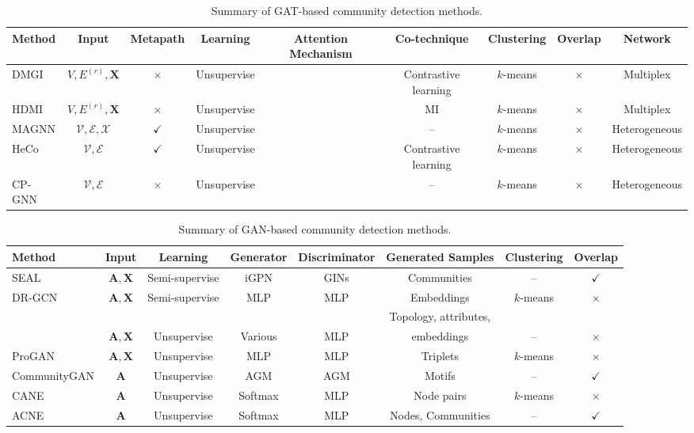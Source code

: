 \begin{table}[h]
\centering \footnotesize
\renewcommand\arraystretch{1.1}
\setlength{\tabcolsep}{2.1mm}
\caption{Summary of GAT-based community detection methods.}
\begin{tabular}{lcccccccc}
\toprule[1 pt]
\textbf{Method} & \textbf{Input} & \textbf{Metapath} & \textbf{Learning} & \textbf{Attention Mechanism} & \textbf{Co-technique} & \textbf{Clustering} & \textbf{Overlap} & \textbf{Network} \\ \midrule
DMGI & $V,E^{(r)},\bm{X}$ & $\times$ & Unsupervise &  & Contrastive learning & $k$-means & $\times$ & Multiplex \\
HDMI & $V,E^{(r)},\bm{X}$ & $\times$ & Unsupervise &  & MI & $k$-means & $\times$ & Multiplex \\
MAGNN & $\mathcal{V},\mathcal{E},\mathcal{X}$ & $\checkmark$ & Unsupervise &  & -- & $k$-means & $\times$ & Heterogeneous\\
HeCo & $\mathcal{V},\mathcal{E}$ & $\checkmark$ & Unsupervise &  & Contrastive learning & $k$-means & $\times$ & Heterogeneous \\ 
CP-GNN & $\mathcal{V},\mathcal{E}$ & $\times$ & Unsupervise &  & -- & $k$-means & $\times$ & Heterogeneous \\ 
\bottomrule[1 pt]
\end{tabular}
\label{table-gat}
\end{table}
\begin{table}[h]
\centering \footnotesize
\renewcommand\arraystretch{1.1}
\setlength{\tabcolsep}{3.5mm}
\caption{Summary of GAN-based community detection methods.} 
\begin{tabular}{lccccccc}
\toprule[1 pt]
\textbf{Method} & \textbf{Input} & \textbf{Learning} & \textbf{Generator} & \textbf{Discriminator} & \textbf{Generated Samples} & \textbf{Clustering} & \textbf{Overlap} \\ 
\midrule
\rowcolor{gray!30}
SEAL & $\bm{A},\bm{X}$ & Semi-supervise & iGPN & GINs & Communities & -- & $\checkmark$ \\
DR-GCN & $\bm{A},\bm{X}$ & Semi-supervise & MLP & MLP & Embeddings & $k$-means & $\times$ \\
\rowcolor{gray!30}
&  &  &  &  & Topology, attributes, &  &  \\
\rowcolor{gray!30}
\multirow{-2}{*}{JANE} & \multirow{-2}{*}{$\bm{A},\bm{X}$} & \multirow{-2}{*}{Unsupervise} & \multirow{-2}{*}{Various} & \multirow{-2}{*}{MLP} & embeddings & \multirow{-2}{*}{--} & \multirow{-2}{*}{$\times$} \\
ProGAN & $\bm{A},\bm{X}$ & Unsupervise & MLP & MLP & Triplets & $k$-means & $\times$ \\
\rowcolor{gray!30}
CommunityGAN & $\bm{A}$ &  Unsupervise & AGM & AGM & Motifs & -- & $\checkmark$ \\
CANE & $\bm{A}$ & Unsupervise & Softmax & MLP & Node pairs & $k$-means & $\times$ \\
\rowcolor{gray!30}
ACNE & $\bm{A}$ & Unsupervise & Softmax & MLP & Nodes, Communities & -- & $\checkmark$ \\
\bottomrule[1 pt]
\end{tabular}
\label{table-gan}
\end{table}
